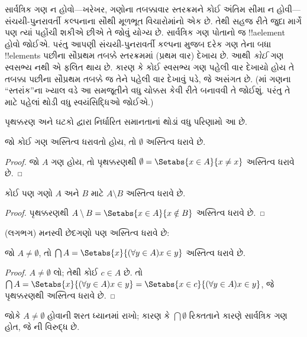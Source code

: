 \documentclass[../../../include/open-logic-section]{subfiles}
\begin{document}
સાર્વત્રિક ગણ ન હોવો---ખરેખર, ગણોના તબક્કાવાર સ્તરક્રમને કોઈ
અંતિમ સીમા ન હોવી---સંચયી-પુનરાવર્તી કલ્પનાના સૌથી મૂળભૂત
વિચારોમાંનો એક છે. તેથી સહજ રીતે જુદા માર્ગે પણ ત્યાં પહોંચી
શકીએ છીએ તે જોવું યોગ્ય છે. સાર્વત્રિક ગણ પોતાનો જ
!!a{element} હોવો જોઈએ. પરંતુ આપણી સંચયી-પુનરાવર્તી કલ્પના મુજબ
દરેક ગણ તેના બધા !!{element}s પછીના સૌપ્રથમ તબક્કે સ્તરક્રમમાં
(પ્રથમ વાર) દેખાય છે. આથી \emph{કોઈ} ગણ સ્વસભ્ય નથી એ ફલિત થાય
છે. કારણ કે કોઈ સ્વસભ્ય ગણ પહેલી વાર દેખાયો હોય તે તબક્કા
પછીના સૌપ્રથમ તબક્કે જ તેને પહેલી વાર દેખાવું પડે, જે અસંગત છે.
(માં ગણના ``સ્તરાંક''ના
ખ્યાલ વડે આ સમજૂતીને વધુ ચોક્કસ કેવી રીતે બનાવવી તે જોઈશું.
પરંતુ તે માટે પહેલાં થોડી વધુ સ્વયંસિદ્ધિઓ જોઈએ.)

પૃથક્કરણ અને ઘટકો દ્વારા નિર્ધારિત સમાનતાનાં થોડાં વધુ પરિણામો
આ છે.

\begin{prop}
જો કોઈ ગણ અસ્તિત્વ ધરાવતો હોય, તો $\emptyset$ અસ્તિત્વ ધરાવે છે.
\end{prop}

\begin{proof}
જો $A$ ગણ હોય, તો પૃથક્કરણથી
$\emptyset = \Setabs{x \in A}{x \neq x}$ અસ્તિત્વ ધરાવે છે.
\end{proof}

\begin{prop}
કોઈ પણ ગણો $A$ અને $B$ માટે $A \setminus B$ અસ્તિત્વ ધરાવે છે.
\end{prop}

\begin{proof}
પૃથક્કરણથી $A \setminus B = \Setabs{x \in A}{x \notin B}$
અસ્તિત્વ ધરાવે છે.
\end{proof}

(લગભગ) મનસ્વી છેદગણો પણ અસ્તિત્વ ધરાવે છે:

\begin{prop}
જો $A \neq \emptyset$, તો
$\bigcap A = \Setabs{x}{(\forall y \in A)x \in y}$ અસ્તિત્વ ધરાવે છે.
\end{prop}

\begin{proof}
$A \neq \emptyset$ લો; તેથી કોઈ $c \in A$ છે. તો
$\bigcap A =
\Setabs{x}{(\forall y \in A)x \in y} = \Setabs{x \in c}{(\forall y \in
A)x \in y}$, જે પૃથક્કરણથી અસ્તિત્વ ધરાવે છે.
\end{proof}

જોકે $A \neq \emptyset$ હોવાની શરત ધ્યાનમાં રાખો; કારણ કે
$\bigcap
\emptyset$ રિક્તતાને કારણે સાર્વત્રિક ગણ હોત, જે
ની વિરુદ્ધ છે.
\end{document}
